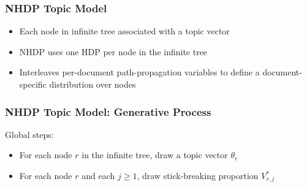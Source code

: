 \begin{frame}
\frametitle{NHDP Topic Model}
\begin{itemize}[<+->]
\item Each node in infinite tree associated with a topic vector
\item NHDP uses one HDP per node in the infinite tree
\item Interleaves per-document path-propagation variables to define a document-specific distribution over nodes
\end{itemize}
\end{frame}

\begin{frame}
\frametitle{NHDP Topic Model: Generative Process}
Global steps:
\begin{itemize}[<+->]
\item For each node $r$ in the infinite tree, draw a topic vector $\theta_r$
\item For each node $r$ and each $j \geq 1$, draw stick-breaking proportion $V^*_{r,j}$
\end{itemize}
\end{frame}

